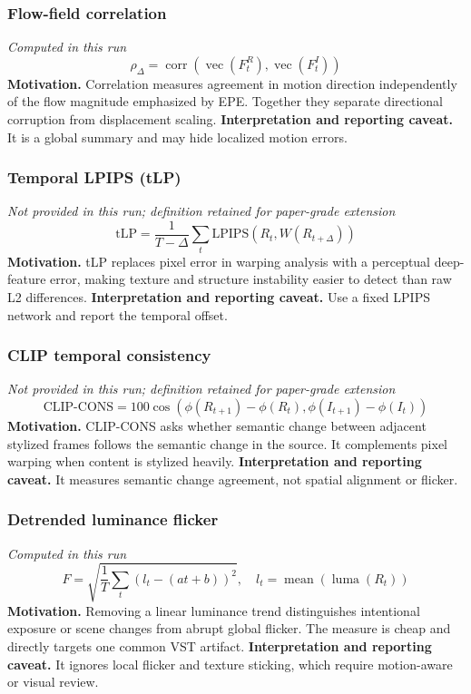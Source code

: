 \documentclass[10pt]{article}
\begin{document}
\subsubsection*{Flow-field correlation}
\textit{Computed in this run}
\begin{equation*}
\rho_{\Delta}=\operatorname{corr}\!\left(\operatorname{vec}(F^R_t),\operatorname{vec}(F^I_t)\right)
\end{equation*}
\textbf{Motivation.} Correlation measures agreement in motion direction independently of the flow magnitude emphasized by EPE. Together they separate directional corruption from displacement scaling.
\textbf{Interpretation and reporting caveat.} It is a global summary and may hide localized motion errors.
\subsubsection*{Temporal LPIPS (tLP)}
\textit{Not provided in this run; definition retained for paper-grade extension}
\begin{equation*}
\mathrm{tLP}=\frac{1}{T-\Delta}\sum_t\mathrm{LPIPS}\!\left(R_t,W(R_{t+\Delta})\right)
\end{equation*}
\textbf{Motivation.} tLP replaces pixel error in warping analysis with a perceptual deep-feature error, making texture and structure instability easier to detect than raw L2 differences.
\textbf{Interpretation and reporting caveat.} Use a fixed LPIPS network and report the temporal offset.
\subsubsection*{CLIP temporal consistency}
\textit{Not provided in this run; definition retained for paper-grade extension}
\begin{equation*}
\mathrm{CLIP\text{-}CONS}=100\cos\!\left(\phi(R_{t+1})-\phi(R_t),\phi(I_{t+1})-\phi(I_t)\right)
\end{equation*}
\textbf{Motivation.} CLIP-CONS asks whether semantic change between adjacent stylized frames follows the semantic change in the source. It complements pixel warping when content is stylized heavily.
\textbf{Interpretation and reporting caveat.} It measures semantic change agreement, not spatial alignment or flicker.
\subsubsection*{Detrended luminance flicker}
\textit{Computed in this run}
\begin{equation*}
F=\sqrt{\frac{1}{T}\sum_t\left(l_t-(at+b)\right)^2},\quad l_t=\operatorname{mean}(\operatorname{luma}(R_t))
\end{equation*}
\textbf{Motivation.} Removing a linear luminance trend distinguishes intentional exposure or scene changes from abrupt global flicker. The measure is cheap and directly targets one common VST artifact.
\textbf{Interpretation and reporting caveat.} It ignores local flicker and texture sticking, which require motion-aware or visual review.
\end{document}
